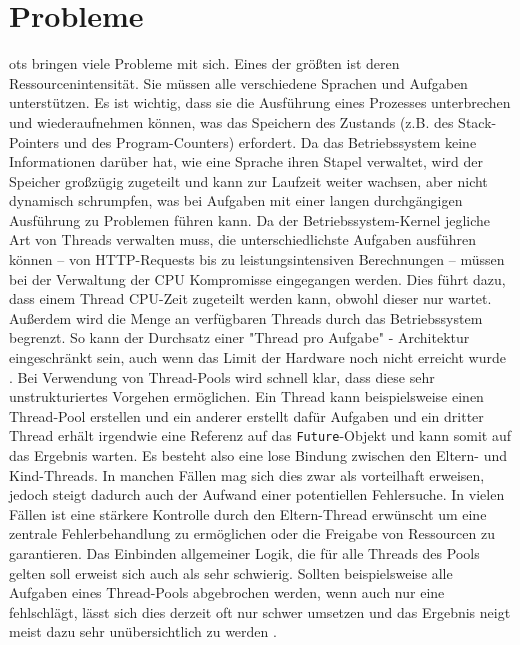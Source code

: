     
\section{Probleme}                                         
\label{sec:Probleme}

    \Glspl{ot} bringen viele Probleme mit sich. Eines der größten ist deren Ressourcenintensität.
    Sie müssen alle verschiedene Sprachen und Aufgaben unterstützen. Es ist wichtig, dass sie die Ausführung eines Prozesses unterbrechen und
    wiederaufnehmen können, 
    was das Speichern des Zustands (z.B. des Stack-Pointers und des Program-Counters) erfordert. Da das Betriebssystem keine Informationen darüber hat, wie
    eine Sprache ihren Stapel verwaltet, wird der Speicher großzügig zugeteilt und kann zur Laufzeit weiter wachsen, aber nicht dynamisch schrumpfen,
    was bei Aufgaben mit einer langen durchgängigen Ausführung zu Problemen führen kann. Da der Betriebssystem-Kernel jegliche Art von Threads verwalten muss,
    die unterschiedlichste Aufgaben ausführen können -- von HTTP-Requests bis zu leistungsintensiven Berechnungen -- müssen bei der
    Verwaltung der CPU Kompromisse eingegangen werden. Dies führt dazu, dass einem Thread CPU-Zeit zugeteilt werden kann, obwohl dieser nur wartet. Außerdem wird die Menge 
    an verfügbaren Threads durch das Betriebssystem begrenzt. So kann der Durchsatz einer "Thread pro Aufgabe" - Architektur eingeschränkt sein, auch wenn das Limit der 
    Hardware noch nicht erreicht wurde \cite{ProjectLoom}. Bei Verwendung von Thread-Pools wird schnell klar, dass diese sehr unstrukturiertes Vorgehen ermöglichen. Ein Thread kann beispielsweise 
    einen Thread-Pool erstellen und ein anderer erstellt dafür Aufgaben und ein dritter Thread erhält irgendwie eine Referenz auf das \texttt{Future}-Objekt und kann somit auf das Ergebnis warten.
    Es besteht also eine lose Bindung zwischen den Eltern- und Kind-Threads. In manchen Fällen mag sich dies zwar als vorteilhaft erweisen, jedoch steigt dadurch auch der Aufwand einer potentiellen 
    Fehlersuche. In vielen Fällen ist eine stärkere Kontrolle durch den Eltern-Thread erwünscht um \zB eine zentrale Fehlerbehandlung zu ermöglichen oder die Freigabe von Ressourcen zu garantieren.
    Das Einbinden allgemeiner Logik, die für alle Threads des Pools gelten soll erweist sich auch als sehr schwierig. Sollten beispielsweise alle Aufgaben eines Thread-Pools abgebrochen werden,
    wenn auch nur eine fehlschlägt, lässt sich dies derzeit oft nur schwer umsetzen und das Ergebnis neigt meist dazu sehr unübersichtlich zu werden \cite{JEP453}. 
    

